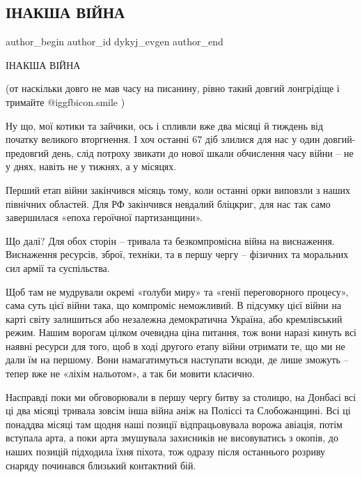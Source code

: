  
 
 
 
 
 
\subsection{ІНАКША ВІЙНА}
\label{sec:01_05_2022.fb.dykyj_evgen.1.inaksha_vijna}
 
\ifcmt
 author_begin
   author_id dykyj_evgen
 author_end
\fi

ІНАКША ВІЙНА

(от наскільки довго не мав часу на писанину, рівно такий довгий лонгрідіще і
тримайте  @igg{fbicon.smile}  )

Ну що, мої котики та зайчики, ось і спливли вже два місяці й тиждень від
початку великого вторгнення. І хоч останні 67 діб злилися для нас у один
довгий-предовгий день, слід потроху звикати до нової шкали обчислення часу
війни – не у днях, навіть не у тижнях, а у місяцях.

Перший етап війни закінчився місяць тому, коли останні орки виповзли з наших
північних областей. Для РФ закінчився невдалий бліцкриг, для нас так само
завершилася «епоха героїчної партизанщини».

Що далі? Для обох сторін – тривала та безкомпромісна війна на виснаження.
Виснаження ресурсів, зброї, техніки, та в першу чергу – фізичних та моральних
сил армії та суспільства.

Щоб там не мудрували окремі «голуби миру» та «генії переговорного процесу»,
сама суть цієї війни така, що компроміс неможливий. В підсумку цієї війни на
карті світу залишиться або незалежна демократична Україна, або кремлівський
режим. Нашим ворогам цілком очевидна ціна питання, тож вони наразі кинуть всі
наявні ресурси для того, щоб в ході другого етапу війни отримати те, що ми не
дали їм на першому. Вони намагатимуться наступати всюди, де лише зможуть –
тепер вже не «ліхім нальотом», а так би мовити класично.

Насправді поки ми обговорювали в першу чергу битву за столицю, на Донбасі всі
ці два місяці тривала зовсім інша війна аніж на Поліссі та Слобожанщині. Всі ці
понаддва місяці там щодня наші позиції відпрацьовувала ворожа авіація, потім
вступала арта, а поки арта змушувала захисників не висовуватись з окопів, до
наших позицій підходила їхня піхота, тож одразу після останнього розриву
снаряду починався близький контактний бій. 

